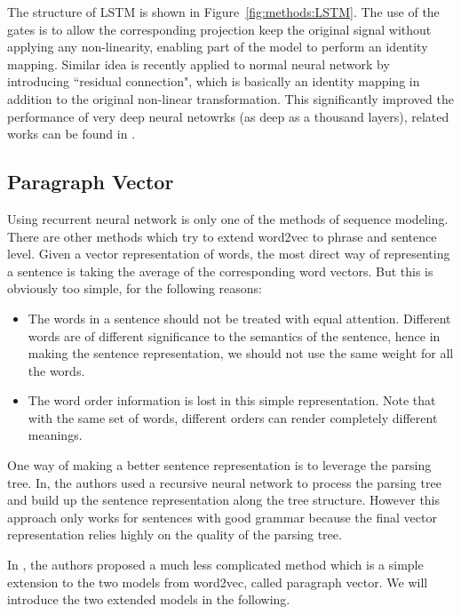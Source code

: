 The structure of LSTM is shown in Figure~\ref{fig:methods:LSTM}. The use of the gates is to allow the corresponding projection keep the original signal without applying any non-linearity, enabling part of the model to perform an identity mapping. Similar idea is recently applied to normal neural network by introducing ``residual connection", which is basically an identity mapping in addition to the original non-linear transformation. This significantly improved the performance of very deep neural netowrks (as deep as a thousand layers), related works can be found in \cite{srivastava2015highway, he2015deep, huang2016deep}.


\subsection{Paragraph Vector}
\label{section:paragraph_vector}
Using recurrent neural network is only one of the methods of sequence modeling. There are other methods which try to extend word2vec to phrase and sentence level. Given a vector representation of words, the most direct way of representing a sentence is taking the average of the corresponding word vectors. But this is obviously too simple, for the following reasons:

\begin{itemize}
    \item The words in a sentence should not be treated with equal attention. Different words are of different significance to the semantics of the sentence, hence in making the sentence representation, we should not use the same weight for all the words.
    \item The word order information is lost in this simple representation. Note that with the same set of words, different orders can render completely different meanings.
\end{itemize}

One way of making a better sentence representation is to leverage the parsing tree. In\cite{socher2011parsing}, the authors used a recursive neural network to process the parsing tree and build up the sentence representation along the tree structure. However this approach only works for sentences with good grammar because the final vector representation relies highly on the quality of the parsing tree.

In \cite{le2014distributed}, the authors proposed a much less complicated method which is a simple extension to the two models from word2vec, called paragraph vector. We will introduce the two extended models in the following.

